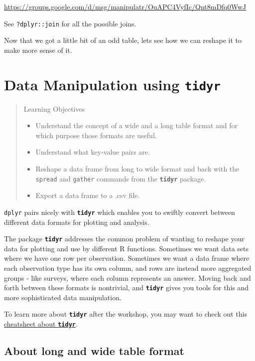 \documentclass[]{book}
\providecommand{\tightlist}{%
  \setlength{\itemsep}{0pt}\setlength{\parskip}{0pt}}
\theoremstyle{definition}
\theoremstyle{definition}
\theoremstyle{definition}
\theoremstyle{remark}
\begin{document}
\url{https://groups.google.com/d/msg/manipulatr/OuAPC4VyfIc/Qnt8mDfq0WwJ}

See \texttt{?dplyr::join} for all the possible joins.

Now that we got a little bit of an odd table, lets see how we can
reshape it to make more sense of it.

\chapter{\texorpdfstring{Data Manipulation using
\textbf{\texttt{tidyr}}}{Data Manipulation using tidyr}}\label{tidyr}

\begin{quote}
Learning Objectives

\begin{itemize}
\tightlist
\item
  Understand the concept of a wide and a long table format and for which
  purpose those formats are useful.
\item
  Understand what key-value pairs are.
\item
  Reshape a data frame from long to wide format and back with the
  \texttt{spread} and \texttt{gather} commands from the
  \textbf{\texttt{tidyr}} package.
\item
  Export a data frame to a .csv file.
\end{itemize}
\end{quote}

\texttt{dplyr} pairs nicely with \textbf{\texttt{tidyr}} which enables
you to swiftly convert between different data formats for plotting and
analysis.

The package \textbf{\texttt{tidyr}} addresses the common problem of
wanting to reshape your data for plotting and use by different R
functions. Sometimes we want data sets where we have one row per
observation. Sometimes we want a data frame where each observation type
has its own column, and rows are instead more aggregated groups - like
surveys, where each column represents an answer. Moving back and forth
between these formats is nontrivial, and \textbf{\texttt{tidyr}} gives
you tools for this and more sophisticated data manipulation.

To learn more about \textbf{\texttt{tidyr}} after the workshop, you may
want to check out this
\href{https://github.com/rstudio/cheatsheets/blob/master/source/pdfs/data-import-cheatsheet.pdf}{cheatsheet
about \textbf{\texttt{tidyr}}}.

\section{About long and wide table
format}\label{about-long-and-wide-table-format}
\end{document}
